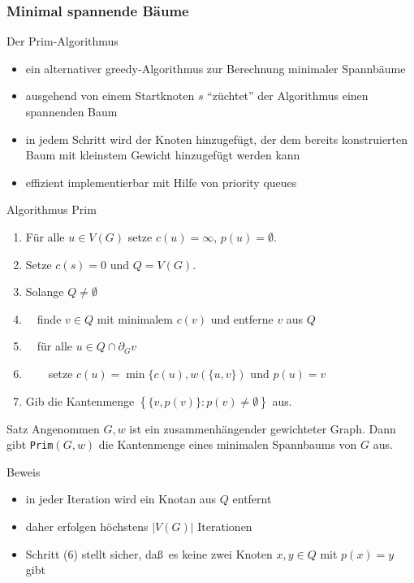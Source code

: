 \documentclass[aspectratio=1610, 11pt]{beamer}
\newcommand\cbc[1]{\left\{{#1}\right\}}
\newcommand{\mytitle}{Minimal spannende B\"aume}
\begin{document}
\begin{frame}\frametitle{\mytitle}
	\begin{overprint}
		\begin{exampleblock}{Der Prim-Algorithmus}
			\begin{itemize}
				\item ein alternativer greedy-Algorithmus zur Berechnung minimaler Spannb\"aume
				\item ausgehend von einem Startknoten $s$ ``z\"uchtet'' der Algorithmus einen spannenden Baum
				\item in jedem Schritt wird der Knoten hinzugef\"ugt, der dem bereits konstruierten Baum mit kleinstem Gewicht hinzugef\"ugt werden kann
				\item effizient implementierbar mit Hilfe von priority queues
			\end{itemize}
		\end{exampleblock}
		\begin{exampleblock}{Algorithmus Prim}
	\begin{enumerate}
		\item F\"ur alle $u\in V(G)$ setze $c(u)=\infty$, $p(u)=\emptyset$.
		\item Setze $c(s)=0$ und $Q=V(G)$.
		\item Solange $Q\neq\emptyset$
		\item $\quad$finde $v\in Q$ mit minimalem $c(v)$ und entferne $v$ aus $Q$
		\item $\quad$f\"ur alle $u\in Q\cap\partial_Gv$
		\item $\quad\quad$setze $c(u)=\min\{c(u),w(\{u,v\})$ und $p(u)=v$
		\item Gib die Kantenmenge $\cbc{\{v,p(v)\}:p(v)\neq\emptyset}$ aus.
	\end{enumerate}
		\end{exampleblock}
\begin{block}{Satz}
	Angenommen $G,w$ ist ein zusammenh\"angender gewichteter Graph.
	Dann gibt {\tt Prim}$(G,w)$ die Kantenmenge eines minimalen Spannbaums von $G$ aus.
\end{block}
\begin{exampleblock}{Beweis}
	\begin{itemize}
		\item in jeder Iteration wird ein Knotan aus $Q$ entfernt
		\item daher erfolgen h\"ochstens $|V(G)|$ Iterationen
		\item Schritt (6) stellt sicher, da\ss\ es keine zwei Knoten $x,y\in Q$ mit $p(x)=y$ gibt

\end{itemize}
\end{exampleblock}
\end{overprint}
\end{frame}
\end{document}
